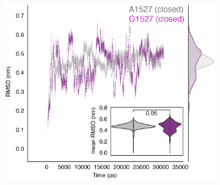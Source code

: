 \begin{figure}[ht]
\begin{subfigure}[t]{0.165\textwidth}
    \end{subfigure}
    \hspace{0.01\textwidth} %
    \begin{subfigure}[t]{0.32\textwidth}
        \caption{}
        \includegraphics[width=\textwidth]{./main_plots/variant_dynamics.png}        
    \end{subfigure}
    \begin{subfigure}[t]{0.16\textwidth}
        \caption{}

\end{subfigure}
\end{figure}
